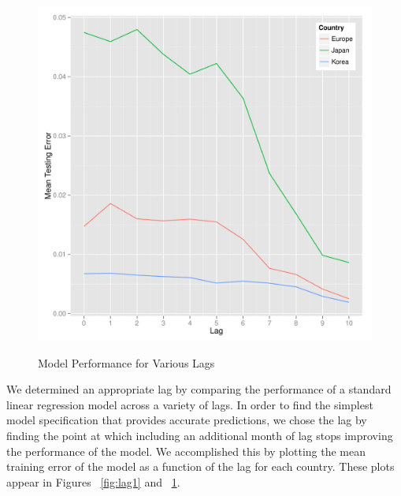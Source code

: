 \documentclass{sig-alternate-05-2015}
\begin{document}
\begin{figure}
\centering
\caption{Model Performance for Various Lags}
\includegraphics[scale=0.45]{lag2.pdf}
\label{fig:lag2}
\end{figure}

We determined an appropriate lag by comparing the performance of a standard linear regression model across a variety of lags. In order to find the simplest model specification that provides accurate predictions, we chose the lag by finding the point at which including an additional month of lag stops improving the performance of the model. We accomplished this by plotting the mean training error of the model as a function of the lag for each country. These plots appear in Figures ~\ref{fig:lag1} and ~\ref{fig:lag2}. 
\end{document}
